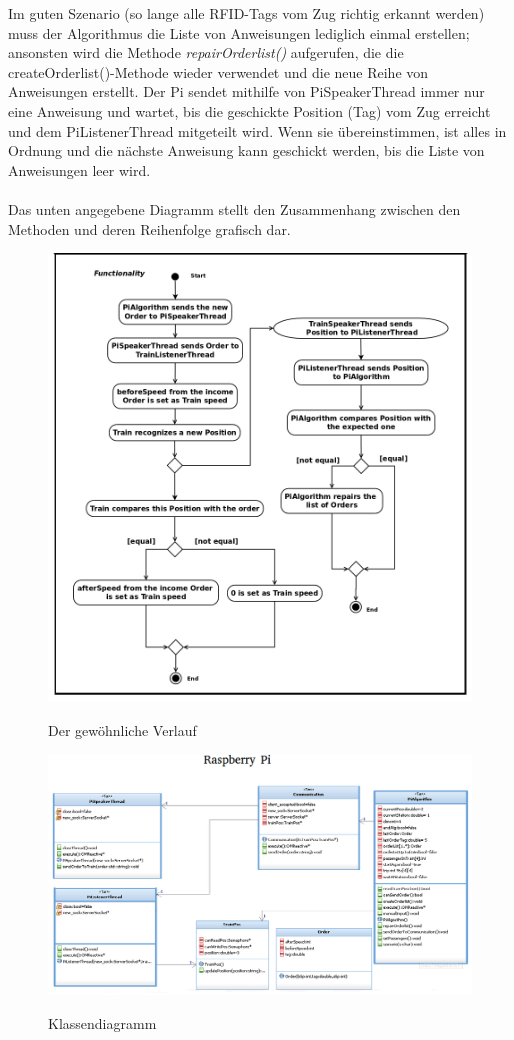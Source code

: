 %
\noindent
Im guten Szenario (so lange alle RFID-Tags vom Zug richtig erkannt werden) muss der Algorithmus die Liste von Anweisungen lediglich einmal erstellen; ansonsten wird die Methode \textit{repairOrderlist()} aufgerufen, die die createOrderlist()-Methode wieder verwendet und die neue Reihe von Anweisungen erstellt. Der Pi sendet mithilfe von PiSpeakerThread immer nur eine Anweisung und wartet, bis die geschickte Position (Tag) vom Zug erreicht und dem PiListenerThread mitgeteilt wird. Wenn sie übereinstimmen, ist alles in Ordnung und die nächste Anweisung kann geschickt werden, bis die Liste von Anweisungen leer wird.\\
\\
Das unten angegebene Diagramm stellt den Zusammenhang zwischen den Methoden und deren Reihenfolge grafisch dar. \\
\begin{figure}[H]	
\caption{Der gewöhnliche Verlauf}
\includegraphics[width=2\textwidth, width=470pt]{content/images/Act-dia2.png}
\label{pic:init}
\end{figure}
%
\begin{figure}[H]	
\caption{Klassendiagramm}
\includegraphics[width=2\textwidth, width=470pt]{content/images/RaspberryPi.png}
\label{pic:init}
\end{figure}
%
